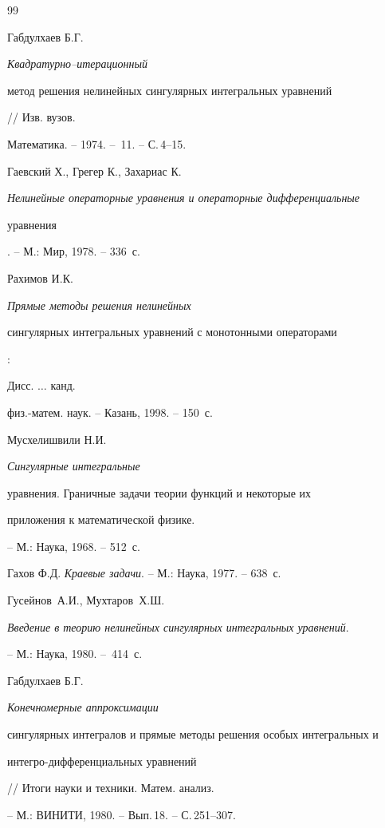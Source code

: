 \begin{thebibliography}{99}







Габдулхаев Б.Г. {\em Квадратурно--итерационный


метод решения нелинейных сингулярных интегральных уравнений} // Изв. вузов.


Математика. -- 1974. -- \No\,11. -- С.\,4--15.




Гаевский Х., Грегер К., Захариас К.


{\em Нелинейные операторные уравнения и операторные дифференциальные


уравнения}. -- М.: Мир, 1978. -- 336~с.




Рахимов И.К. {\em Прямые методы решения нелинейных


сингулярных интегральных уравнений с монотонными операторами}:


Дисс. $\dotsc$ канд.


физ.-матем. наук. -- Казань, 1998. -- 150~с.




Мусхелишвили Н.И. {\em Сингулярные интегральные


уравнения. Граничные задачи теории функций и некоторые их


приложения к математической физике.} -- М.: Наука, 1968. -- 512~с.




Гахов Ф.Д. {\em Краевые задачи}. -- М.: Наука, 1977. -- 638~с.




Гусейнов~А.И., Мухтаров~Х.Ш.


{\em Введение в теорию нелинейных сингулярных интегральных уравнений}.


-- М.: Наука, 1980. --~414~с.




Габдулхаев Б.Г. {\em Конечномерные аппроксимации


сингулярных интегралов и прямые методы решения особых интегральных и


интегро-дифференциальных уравнений} // Итоги науки и техники. Матем. анализ.


-- М.: ВИНИТИ, 1980. -- Вып.\,18. -- С.\,251--307.





\end{thebibliography}

